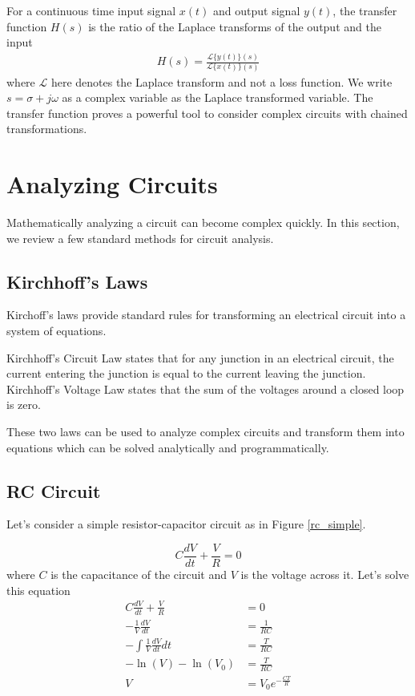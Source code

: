 \documentclass[book.tex]{subfiles}
\begin{document}
For a continuous time input signal $x(t)$ and output signal $y(t)$, the transfer function $H(s)$ is the ratio of the Laplace transforms of the output and the input
\begin{align}
    H(s) = \frac{\mathcal{L}\{y(t)\}(s)}{\mathcal{L}\{x(t)\}(s)}
\end{align}
where $\mathcal{L}$ here denotes the Laplace transform and not a loss function. We write $s = \sigma + j\omega$ as a complex variable as the Laplace transformed variable. The transfer function proves a powerful tool to consider complex circuits with chained transformations.



\section{Analyzing Circuits}

Mathematically analyzing a circuit can become complex quickly. In this section, we review a few standard methods for circuit analysis.

\subsection{Kirchhoff's Laws}

Kirchoff's laws provide standard rules for transforming an electrical circuit into a system of equations.

Kirchhoff's Circuit Law states that for any junction in an electrical circuit, the current entering the junction is equal to the current leaving the junction. Kirchhoff's Voltage Law states that the sum of the voltages around a closed loop is zero.

These two laws can be used to analyze complex circuits and transform them into equations which can be solved analytically and programmatically.

\subsection{RC Circuit}

Let's consider a simple resistor-capacitor circuit as in Figure \ref{rc_simple}. 

\begin{equation}
C \frac{dV}{dt} + \frac{V}{R} = 0
\end{equation}
where $C$ is the capacitance of the circuit and $V$ is the voltage across it. Let's solve this equation
\begin{align}
    C \frac{dV}{dt} + \frac{V}{R} &= 0 \\
    -\frac{1}{V} \frac{dV}{dt} &= \frac{1}{RC} \\
    - \int \frac{1}{V} \frac{dV}{dt} dt &= \frac{T}{RC} \\
    - \ln(V) - \ln(V_0) &= \frac{T}{RC} \\
    V &= V_0 e^{-\frac{CT}{R}}
\end{align}
\end{document}
